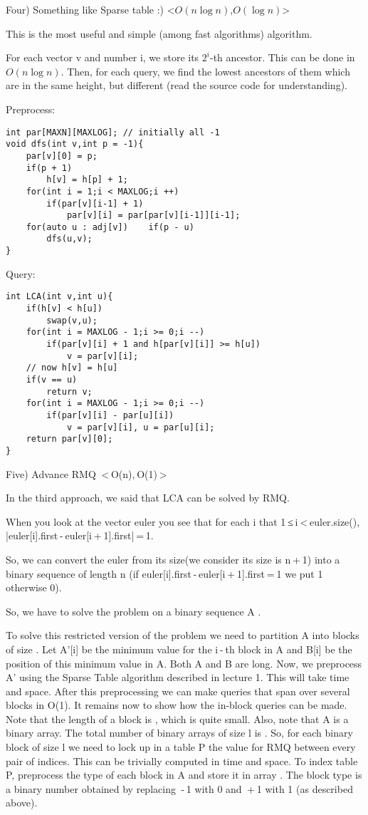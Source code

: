 Four) Something like Sparse table :) <$O(n\log{n})$,$O(\log{n})$>

This is the most useful and simple (among fast algorithms) algorithm.

For each vector v and number i, we store its $2^i$-th ancestor. This can be done in $O(n\log{n})$. Then, for each query, we find the lowest ancestors of them which are in the same height, but different (read the source code for understanding).

Preprocess:
\begin{verbatim}
int par[MAXN][MAXLOG]; // initially all -1
void dfs(int v,int p = -1){
	par[v][0] = p;
	if(p + 1)
		h[v] = h[p] + 1;
	for(int i = 1;i < MAXLOG;i ++)
		if(par[v][i-1] + 1)
			par[v][i] = par[par[v][i-1]][i-1];
	for(auto u : adj[v])	if(p - u)
		dfs(u,v);
}
\end{verbatim}
Query:
\begin{verbatim}
int LCA(int v,int u){
	if(h[v] < h[u])
		swap(v,u);
	for(int i = MAXLOG - 1;i >= 0;i --)
		if(par[v][i] + 1 and h[par[v][i]] >= h[u])
			v = par[v][i];
	// now h[v] = h[u]
	if(v == u)
		return v;
	for(int i = MAXLOG - 1;i >= 0;i --)
		if(par[v][i] - par[u][i])
			v = par[v][i], u = par[u][i];
	return par[v][0];
}
\end{verbatim}

Five) Advance RMQ  < O(n), O(1) > 

In the third approach, we said that LCA can be solved by RMQ.

When you look at the vector euler you see that for each i that 1 ≤ i < euler.size(), |euler[i].first - euler[i + 1].first| = 1.

So, we can convert the euler from its size(we consider its size is n + 1) into a binary sequence of length n (if euler[i].first - euler[i + 1].first = 1 we put 1 otherwise 0).

So, we have to solve the problem on a binary sequence A .

To solve this restricted version of the problem we need to partition A into blocks of size . Let A'[i] be the minimum value for the i - th block in A and B[i] be the position of this minimum value in A. Both A and B are  long. Now, we preprocess A' using the Sparse Table algorithm described in lecture 1. This will take  time and space. After this preprocessing we can make queries that span over several blocks in O(1). It remains now to show how the in-block queries can be made. Note that the length of a block is , which is quite small. Also, note that A is a binary array. The total number of binary arrays of size l is . So, for each binary block of size l we need to lock up in a table P the value for RMQ between every pair of indices. This can be trivially computed in  time and space. To index table P, preprocess the type of each block in A and store it in array . The block type is a binary number obtained by replacing  - 1 with 0 and  + 1 with 1 (as described above).

